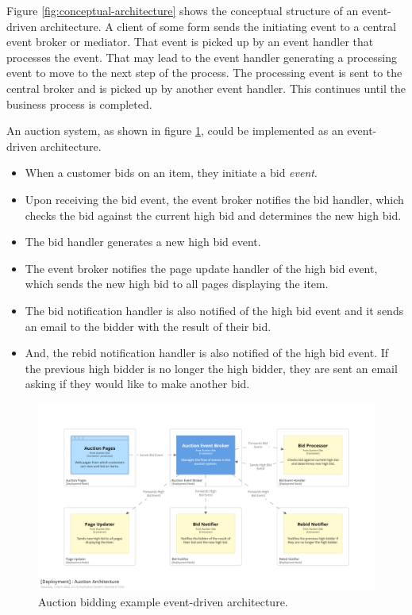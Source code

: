 Figure \ref{fig:conceptual-architecture} shows the conceptual structure of an event-driven architecture.
A client of some form sends the initiating event to a central event broker or mediator.
That event is picked up by an event handler that processes the event.
That may lead to the event handler generating a processing event to move to the next step of the process.
The processing event is sent to the central broker and is picked up by another event handler.
This continues until the business process is completed.

\filbreak
An auction system, as shown in figure \ref{fig:auction-architecture}, could be implemented as an event-driven architecture.
\begin{itemize}[nosep]
    \item When a customer bids on an item, they initiate a bid \emph{event}.
    \item Upon receiving the bid event, the event broker notifies the bid handler, which checks the bid against the current high bid and determines the new high bid.
    \item The bid handler generates a new high bid event.
    \item The event broker notifies the page update handler of the high bid event, which sends the new high bid to all pages displaying the item.
    \item The bid notification handler is also notified of the high bid event and it sends an email to the bidder with the result of their bid.
    \item And, the rebid notification handler is also notified of the high bid event.
             If the previous high bidder is no longer the high bidder, they are sent an email asking if they would like to make another bid.
\end{itemize}

\begin{figure}[h!]
    \begin{adjustwidth}{-10mm}{-10mm}
        \centering
        \includegraphics[trim=195 195 195 195,clip,width=0.95\paperwidth]{diagrams/auction-architecture.png}
    \end{adjustwidth}
    \caption{Auction bidding example event-driven architecture.}
    \label{fig:auction-architecture}
\end{figure}

